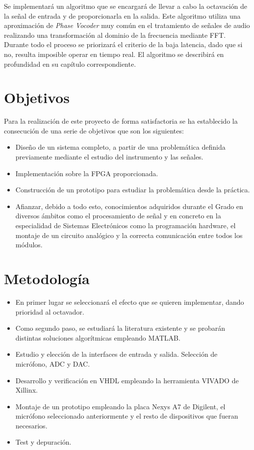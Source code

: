 Se implementará un algoritmo que se encargará de llevar a cabo la octavación de la señal de entrada y de proporcionarla en la salida. Este algoritmo utiliza una aproximación de \emph{Phase Vocoder} muy común en el tratamiento de señales de audio realizando una transformación al dominio de la frecuencia mediante FFT. Durante todo el proceso se priorizará el criterio de la baja latencia, dado que si no, resulta imposible operar en tiempo real. El algoritmo se describirá en profundidad en su capítulo correspondiente.

\section{Objetivos}
Para la realización de este proyecto de forma satisfactoria se ha establecido la consecución de una serie de objetivos que son los siguientes:
\begin{itemize}
\item Diseño de un sistema completo, a partir de una problemática definida previamente mediante el estudio del instrumento y las señales.
\item Implementación sobre la FPGA proporcionada.
\item Construcción de un prototipo para estudiar la problemática desde la práctica.
\item Afianzar, debido a todo esto, conocimientos adquiridos durante el Grado en diversos ámbitos como el procesamiento de señal y en concreto en la especialidad de Sistemas Electrónicos como la programación hardware, el montaje de un circuito analógico y la correcta comunicación entre todos los módulos.
\end{itemize}

\section{Metodología}
\begin{itemize}
\item En primer lugar se seleccionará el efecto que se quieren implementar, dando prioridad al octavador.
\item Como segundo paso, se estudiará la literatura existente y se probarán distintas soluciones algorítmicas empleando MATLAB.
\item Estudio y elección de la interfaces de entrada y salida. Selección de micrófono, ADC y DAC.
\item Desarrollo y verificación en VHDL empleando la herramienta VIVADO de Xillinx.
\item Montaje de un prototipo empleando la placa Nexys A7 de Digilent, el micrófono seleccionado anteriormente y el resto de dispositivos que fueran necesarios.
\item Test y depuración.
\end{itemize}

